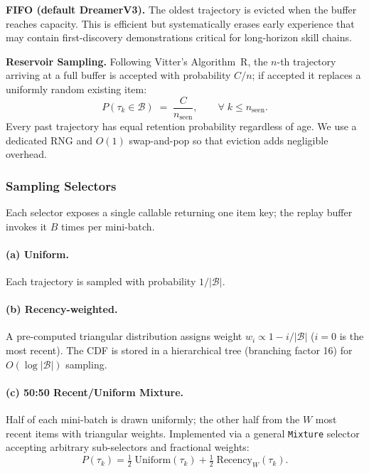 \documentclass{article}
\begin{document}
\textbf{FIFO (default DreamerV3).}\;
The oldest trajectory is evicted when the buffer reaches capacity.
This is efficient but systematically erases early experience that may
contain first-discovery demonstrations critical for long-horizon skill
chains.

\textbf{Reservoir Sampling.}\;
Following Vitter's Algorithm~R, the $n$-th trajectory arriving at a
full buffer is accepted with probability $C/n$; if accepted it
replaces a uniformly random existing item:
\begin{equation}
  P(\tau_k \in \mathcal{B})
  \;=\;
  \frac{C}{n_{\mathrm{seen}}},
  \qquad \forall\; k \le n_{\mathrm{seen}}.
  \label{eq:reservoir}
\end{equation}
Every past trajectory has equal retention probability regardless of
age.  We use a dedicated RNG and $O(1)$ swap-and-pop so that
eviction adds negligible overhead.

\subsubsection{Sampling Selectors}
\label{sec:selectors}

Each selector exposes a single callable returning one item key; the
replay buffer invokes it $B$ times per mini-batch.

\paragraph{(a) Uniform.}
Each trajectory is sampled with probability $1/|\mathcal{B}|$.

\paragraph{(b) Recency-weighted.}
A pre-computed triangular distribution assigns weight
$w_i \propto 1 - i/|\mathcal{B}|$ ($i\!=\!0$ is the most recent).
The CDF is stored in a hierarchical tree (branching factor 16) for
$O(\log|\mathcal{B}|)$ sampling.

\paragraph{(c) 50:50 Recent/Uniform Mixture.}
Half of each mini-batch is drawn uniformly; the other half from the
$W$ most recent items with triangular weights.  Implemented via a
general \texttt{Mixture} selector accepting arbitrary sub-selectors
and fractional weights:
\begin{equation}
  P(\tau_k)
  = \tfrac12\;\text{Uniform}(\tau_k)
  + \tfrac12\;\text{Recency}_W(\tau_k).
  \label{eq:fiftyfifty}
\end{equation}
\end{document}

